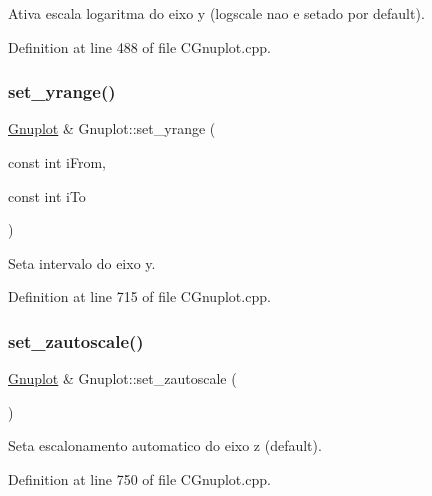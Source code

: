 Ativa escala logaritma do eixo y (logscale nao e setado por default). 



Definition at line 488 of file C\+Gnuplot.\+cpp.

\mbox{\label{class_gnuplot_af621a43664a07523f098ffc3fb5a99b0}} 
\subsubsection{\texorpdfstring{set\+\_\+yrange()}{set\_yrange()}}
{\footnotesize\ttfamily \hyperlink{class_gnuplot}{Gnuplot} \& Gnuplot\+::set\+\_\+yrange (\begin{DoxyParamCaption}\item[{const int}]{i\+From,  }\item[{const int}]{i\+To }\end{DoxyParamCaption})}



Seta intervalo do eixo y. 



Definition at line 715 of file C\+Gnuplot.\+cpp.

\mbox{\label{class_gnuplot_ad72aa208fad039b6b7d13ea9595ce157}} 
\subsubsection{\texorpdfstring{set\+\_\+zautoscale()}{set\_zautoscale()}}
{\footnotesize\ttfamily \hyperlink{class_gnuplot}{Gnuplot} \& Gnuplot\+::set\+\_\+zautoscale (\begin{DoxyParamCaption}{ }\end{DoxyParamCaption})}



Seta escalonamento automatico do eixo z (default). 



Definition at line 750 of file C\+Gnuplot.\+cpp.

\mbox{\label{class_gnuplot_ab3206e715d20f05cc0dd1eec89ce8b07}} 

